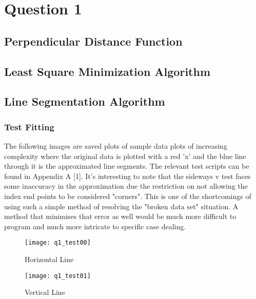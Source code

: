 \newpage
\section{Question 1}
	
	\subsection{Perpendicular Distance Function}	%
		
		\pagebreak
	\subsection{Least Square Minimization Algorithm}	%
		
		\pagebreak
	\subsection{Line Segmentation Algorithm}	%
		
		\linebreak
		\newline
		\subsubsection{Test Fitting}
			The following images are saved plots of sample data plots of increasing complexity where the original data is plotted with a red 'x' and the blue line through it is the approximated line segments. The relevant test scripts can be found in Appendix A [1].
			It's interesting to note that the sideways v test faces some inaccuracy in the approximation due the restriction on not allowing the index end points to be considered "corners". This is one of the shortcomings of using such a simple method of resolving the "broken data set" situation. A method that minimises that error as well would be much more difficult to program and much more intricate to specific case dealing.
			\begin{figure}[position = here]
				\begin{centering}
					\texttt{[image: q1\_test00]}\\
					\caption[\textit{RPYAxes}]{Horizontal Line}
				\end{centering}
			\end{figure}
			\newline
			
			\begin{figure}[position = here]
				\begin{centering}
					\texttt{[image: q1\_test01]}\\
					\caption[\textit{RPYAxes}]{Vertical Line}
				\end{centering}
			\end{figure}
			\newline
			
